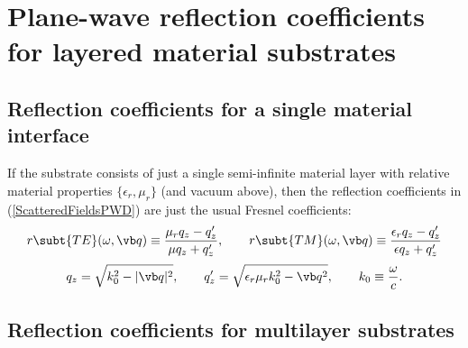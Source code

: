 \documentclass[letterpaper]{article}
\begin{document}
\newpage
\section{Plane-wave reflection coefficients for layered material substrates}
\label{ReflectionCoefficientAppendix}

\subsection{Reflection coefficients for a single material interface}

If the substrate consists of just a single semi-infinite material layer
with relative material properties $\{\epsilon_r,\mu_r\}$ (and vacuum
above), then the reflection coefficients in (\ref{ScatteredFieldsPWD}) 
are just the usual Fresnel coefficients:
$$
   r\subt{TE}(\omega,\vb q) \equiv \frac{\mu_r q_z - q_z^\prime}{\mu q_z + q_z^\prime},
   \qquad
   r\subt{TM}(\omega,\vb q) \equiv \frac{\epsilon_r q_z - q_z^\prime}{\epsilon q_z + q_z^\prime}
$$
$$ q_z=
   \sqrt{k_0^2 - |\vb q|^2},
   \qquad
   q_z^\prime=
   \sqrt{\epsilon_r \mu_r k_0^2 - \vb q^2},
   \qquad
   k_0\equiv\frac{\omega}{c}.
$$

\subsection{Reflection coefficients for multilayer substrates}
\end{document}
